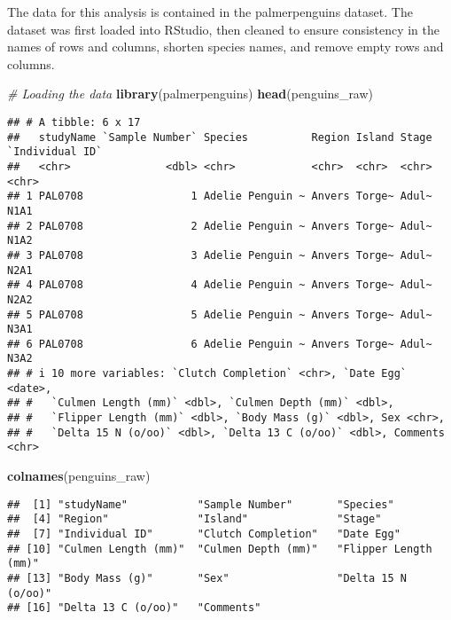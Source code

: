 \documentclass[
]{article}
\newenvironment{Shaded}{\begin{snugshade}}{\end{snugshade}}
\newcommand{\CommentTok}[1]{\textcolor[rgb]{0.56,0.35,0.01}{\textit{#1}}}
\newcommand{\FunctionTok}[1]{\textcolor[rgb]{0.13,0.29,0.53}{\textbf{#1}}}
\newcommand{\NormalTok}[1]{#1}
\begin{document}
The data for this analysis is contained in the palmerpenguins dataset.
The dataset was first loaded into RStudio, then cleaned to ensure
consistency in the names of rows and columns, shorten species names, and
remove empty rows and columns.

\begin{Shaded}
\begin{Highlighting}[]
\CommentTok{\# Loading the data}
\FunctionTok{library}\NormalTok{(palmerpenguins)}
\FunctionTok{head}\NormalTok{(penguins\_raw)}
\end{Highlighting}
\end{Shaded}

\begin{verbatim}
## # A tibble: 6 x 17
##   studyName `Sample Number` Species          Region Island Stage `Individual ID`
##   <chr>               <dbl> <chr>            <chr>  <chr>  <chr> <chr>          
## 1 PAL0708                 1 Adelie Penguin ~ Anvers Torge~ Adul~ N1A1           
## 2 PAL0708                 2 Adelie Penguin ~ Anvers Torge~ Adul~ N1A2           
## 3 PAL0708                 3 Adelie Penguin ~ Anvers Torge~ Adul~ N2A1           
## 4 PAL0708                 4 Adelie Penguin ~ Anvers Torge~ Adul~ N2A2           
## 5 PAL0708                 5 Adelie Penguin ~ Anvers Torge~ Adul~ N3A1           
## 6 PAL0708                 6 Adelie Penguin ~ Anvers Torge~ Adul~ N3A2           
## # i 10 more variables: `Clutch Completion` <chr>, `Date Egg` <date>,
## #   `Culmen Length (mm)` <dbl>, `Culmen Depth (mm)` <dbl>,
## #   `Flipper Length (mm)` <dbl>, `Body Mass (g)` <dbl>, Sex <chr>,
## #   `Delta 15 N (o/oo)` <dbl>, `Delta 13 C (o/oo)` <dbl>, Comments <chr>
\end{verbatim}

\begin{Shaded}
\begin{Highlighting}[]
\FunctionTok{colnames}\NormalTok{(penguins\_raw)}
\end{Highlighting}
\end{Shaded}

\begin{verbatim}
##  [1] "studyName"           "Sample Number"       "Species"            
##  [4] "Region"              "Island"              "Stage"              
##  [7] "Individual ID"       "Clutch Completion"   "Date Egg"           
## [10] "Culmen Length (mm)"  "Culmen Depth (mm)"   "Flipper Length (mm)"
## [13] "Body Mass (g)"       "Sex"                 "Delta 15 N (o/oo)"  
## [16] "Delta 13 C (o/oo)"   "Comments"
\end{verbatim}
\end{document}
